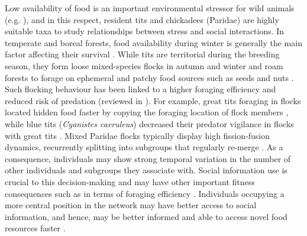 \documentclass[10pt, twoside]{book} %
\begin{document}
Low availability of food is an important environmental stressor for wild animals (e.g. \citealt{Kitaysky1999}), and in this respect, resident tits and chickadees (Paridae) are highly suitable taxa to study relationships between stress and social interactions. In temperate and boreal forests, food availability during winter is generally the main factor affecting their survival \citep{Jansson1981, Brittingham1988, Perdeck2000}. While tits are territorial during the breeding season, they form loose mixed-species flocks in autumn and winter and roam forests to forage on ephemeral and patchy food sources such as seeds and nuts \citep{Ekman1989, Farine2012}. Such flocking behaviour has been linked to a higher foraging efficiency and reduced risk of predation (reviewed in \citealt{Sridhar2009}). For example, great tits foraging in flocks located hidden food faster by copying the foraging location of flock members \citep{Krebs1972}, while blue tits (\textit{Cyanistes caeruleus}) decreased their predator vigilance in flocks with great tits \citep{Telleria2001}. Mixed Paridae flocks typically display high fission-fusion dynamics, recurrently splitting into subgroups that regularly re-merge \citep{Farine2015b}. As a consequence, individuals may show strong temporal variation in the number of other individuals and subgroups they associate with. Social information use is crucial to this decision-making and may have other important fitness consequences such as in terms of foraging efficiency \citep{Sueur2011}. Individuals occupying a more central position in the network may have better access to social information, and hence, may be better informed and able to access novel food resources faster \citep{Aplin2012, Farine2015a, Firth2016}.\\
\end{document}

